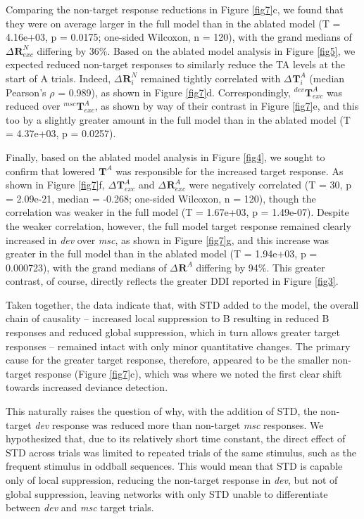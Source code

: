 \documentclass[pdflatex,referee,iicol,sn-basic]{sn-jnl}
\newcommand{\dev}{\textit{dev}}
\newcommand{\msc}{\textit{msc}}
\renewcommand{\R}[3][]{{}^{#1}_{}\mathbf{R}^{#2}_{#3}}
\renewcommand{\T}[3][]{{}^{#1}_{}\mathbf{T}^{#2}_{#3}}
\newcommand{\reffig}[1]{Figure \ref{fig#1}}
\newcommand{\refpanel}[2]{Figure \ref{fig#1}\lowercase{#2}}
\begin{document}
Comparing the non-target response reductions in \refpanel{7}{c}, we found that they were on average larger in the full model than in the ablated model (T = 4.16e+03, p = 0.0175; one-sided Wilcoxon, n = 120), with the grand medians of $\Delta \R{N}{exc}$ differing by 36\%. Based on the ablated model analysis in \reffig{5}, we expected reduced non-target responses to similarly reduce the TA levels at the start of A trials. Indeed, $\Delta \R{N}{i}$ remained tightly correlated with $\Delta \T{A}{i}$ (median Pearson's $\rho$ = 0.989), as shown in \refpanel{7}{d}. Correspondingly, $\T[dev]{A}{exc}$ was reduced over $\T[msc]{A}{exc}$, as shown by way of their contrast in \refpanel{7}{e}, and this too by a slightly greater amount in the full model than in the ablated model (T = 4.37e+03, p = 0.0257).

Finally, based on the ablated model analysis in \reffig{4}, we sought to confirm that lowered $\T{A}{}$ was responsible for the increased target response. As shown in \refpanel{7}{f}, $\Delta \T{A}{exc}$ and $\Delta \R{A}{exc}$ were negatively correlated (T = 30, p = 2.09e-21, median = -0.268; one-sided Wilcoxon, n = 120), though the correlation was weaker in the full model (T = 1.67e+03, p = 1.49e-07). Despite the weaker correlation, however, the full model target response remained clearly increased in \dev{} over \msc{}, as shown in \refpanel{7}{g}, and this increase was greater in the full model than in the ablated model (T = 1.94e+03, p = 0.000723), with the grand medians of $\Delta \R{A}{}$ differing by 94\%. This greater contrast, of course, directly reflects the greater DDI reported in \reffig{3}.

Taken together, the data indicate that, with STD added to the model, the overall chain of causality -- increased local suppression to B resulting in reduced B responses and reduced global suppression, which in turn allows greater target responses -- remained intact with only minor quantitative changes. The primary cause for the greater target response, therefore, appeared to be the smaller non-target response (\refpanel{7}{c}), which was where we noted the first clear shift towards increased deviance detection.

This naturally raises the question of why, with the addition of STD, the non-target \dev{} response was reduced more than non-target \msc{} responses. We hypothesized that, due to its relatively short time constant, the direct effect of STD across trials was limited to repeated trials of the same stimulus, such as the frequent stimulus in oddball sequences. This would mean that STD is capable only of local suppression, reducing the non-target response in \dev{}, but not of global suppression, leaving networks with only STD unable to differentiate between \dev{} and \msc{} target trials.
\end{document}
